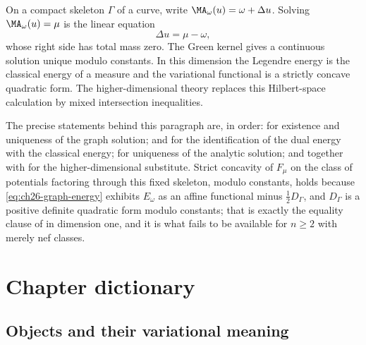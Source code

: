 \begin{example}
\label{ex:ch28-graph-case}
On a compact skeleton $\Gamma$ of a curve, write
$\MA_\omega(u)=\omega+\Delta u$.  Solving
$\MA_\omega(u)=\mu$ is the linear equation
\[
                          \Delta u=\mu-\omega,
\]
whose right side has total mass zero.  The Green kernel gives a continuous
solution unique modulo constants.  In this dimension the Legendre energy is
the classical energy of a measure and the variational functional is a
strictly concave quadratic form.  The higher-dimensional theory replaces
this Hilbert-space calculation by mixed intersection inequalities.

The precise statements behind this paragraph are, in order:
 for existence and uniqueness of the graph
solution;  and
 for the identification of the dual energy
with the classical energy;  for uniqueness
of the analytic solution; and
 together with
 for the higher-dimensional substitute.  Strict
concavity of $F_\mu$ on the class of potentials factoring through this fixed skeleton,
modulo constants, holds because
\eqref{eq:ch26-graph-energy} exhibits $E_\omega$ as an affine functional
minus $\tfrac12D_\Gamma$, and $D_\Gamma$ is a positive definite
quadratic form modulo constants; that is exactly the equality clause of
 in dimension one, and it is what fails to be
available for $n\geq2$ with merely nef classes.
\end{example}

\section{Chapter dictionary}
\label{sec:ch28-dictionary}

\subsection{Objects and their variational meaning}
\label{sec:ch28-dict-objects}

